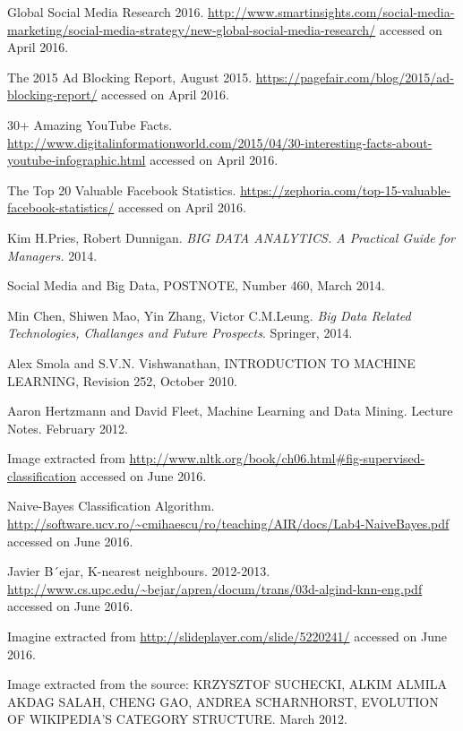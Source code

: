 \begin{thebibliography}{99999}
\singlespace\normalsize

 Global Social Media Research 2016. \url{http://www.smartinsights.com/social-media-marketing/social-media-strategy/new-global-social-media-research/} accessed on April 2016.

 The 2015 Ad  Blocking Report, August 2015. \url{https://pagefair.com/blog/2015/ad-blocking-report/} accessed on April 2016.

 30+ Amazing YouTube Facts. \url{http://www.digitalinformationworld.com/2015/04/30-interesting-facts-about-youtube-infographic.html} accessed on April 2016.

 The Top 20 Valuable Facebook Statistics. \url{https://zephoria.com/top-15-valuable-facebook-statistics/} accessed on April 2016.

 Kim H.Pries, Robert Dunnigan. \textit{BIG DATA ANALYTICS. A Practical Guide for Managers.} 2014.

 Social Media and Big Data, POSTNOTE, Number 460, March 2014.

 Min Chen, Shiwen Mao, Yin Zhang, Victor C.M.Leung. \textit{Big Data Related Technologies, Challanges and Future Prospects}. Springer, 2014.

 Alex Smola and S.V.N. Vishwanathan, INTRODUCTION TO MACHINE LEARNING, Revision 252, October 2010.

 Aaron Hertzmann and David Fleet, Machine Learning and Data Mining. Lecture Notes. February 2012.

 Image extracted from \url{http://www.nltk.org/book/ch06.html#fig-supervised-classification} accessed on June 2016.

 Naive-Bayes Classification Algorithm. \url{http://software.ucv.ro/~cmihaescu/ro/teaching/AIR/docs/Lab4-NaiveBayes.pdf} accessed on June 2016.

 Javier B´ejar, K-nearest neighbours. 2012-2013. \url{http://www.cs.upc.edu/~bejar/apren/docum/trans/03d-algind-knn-eng.pdf} accessed on June 2016.

 Imagine extracted from \url{http://slideplayer.com/slide/5220241/} accessed on June 2016.

 Image extracted from the source: KRZYSZTOF SUCHECKI, ALKIM ALMILA AKDAG SALAH, CHENG GAO, ANDREA SCHARNHORST, EVOLUTION OF WIKIPEDIA’S CATEGORY STRUCTURE. March 2012.


\end{thebibliography}
